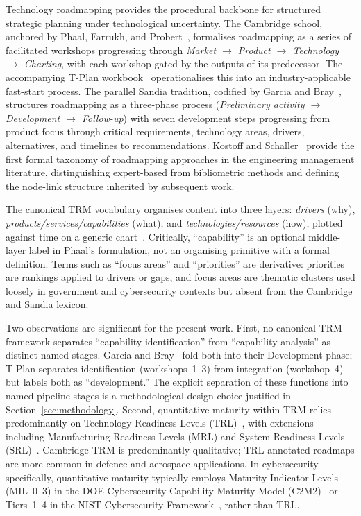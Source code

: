Technology roadmapping provides the procedural backbone for structured
strategic planning under technological uncertainty. The Cambridge school,
anchored by Phaal, Farrukh, and Probert~\cite{phaal2004}, formalises
roadmapping as a series of facilitated workshops progressing through
\textit{Market $\rightarrow$ Product $\rightarrow$ Technology $\rightarrow$
Charting}, with each workshop gated by the outputs of its predecessor.
The accompanying T-Plan workbook~\cite{phaal2001_tplan} operationalises
this into an industry-applicable fast-start process. The parallel Sandia
tradition, codified by Garcia and Bray~\cite{garcia1997}, structures
roadmapping as a three-phase process (\textit{Preliminary activity
$\rightarrow$ Development $\rightarrow$ Follow-up}) with seven
development steps progressing from product focus through critical
requirements, technology areas, drivers, alternatives, and timelines
to recommendations. Kostoff and Schaller~\cite{kostoff2001} provide
the first formal taxonomy of roadmapping approaches in the engineering
management literature, distinguishing expert-based from bibliometric
methods and defining the node-link structure inherited by subsequent
work.

The canonical TRM vocabulary organises content into three layers:
\textit{drivers} (why), \textit{products/services/capabilities} (what),
and \textit{technologies/resources} (how), plotted against time on a
generic chart~\cite{phaal2004,kerr2022}. Critically, ``capability'' is
an optional middle-layer label in Phaal's formulation, not an organising
primitive with a formal definition. Terms such as ``focus areas'' and
``priorities'' are derivative: priorities are rankings applied to drivers
or gaps, and focus areas are thematic clusters used loosely in
government and cybersecurity contexts but absent from the Cambridge and
Sandia lexicon.

Two observations are significant for the present work. First, no
canonical TRM framework separates ``capability identification'' from
``capability analysis'' as distinct named stages. Garcia and
Bray~\cite{garcia1997} fold both into their Development phase; T-Plan
separates identification (workshops~1--3) from integration (workshop~4)
but labels both as ``development.'' The explicit separation of these
functions into named pipeline stages is a methodological design choice
justified in Section~\ref{sec:methodology}. Second, quantitative
maturity within TRM relies predominantly on Technology Readiness Levels
(TRL)~\cite{mankins1995,iso16290}, with extensions including
Manufacturing Readiness Levels (MRL) and System Readiness Levels
(SRL)~\cite{sauser2008}. Cambridge TRM is predominantly qualitative;
TRL-annotated roadmaps are more common in defence and aerospace
applications. In cybersecurity specifically, quantitative maturity
typically employs Maturity Indicator Levels (MIL~0--3) in the DOE
Cybersecurity Capability Maturity Model (C2M2)~\cite{doe_c2m2} or
Tiers~1--4 in the NIST Cybersecurity Framework~\cite{nist_csf2},
rather than TRL.

